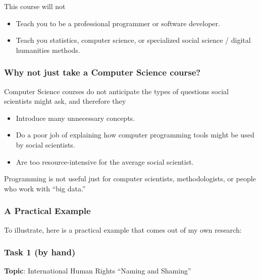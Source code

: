 \documentclass[
]{book}
\providecommand{\tightlist}{%
  \setlength{\itemsep}{0pt}\setlength{\parskip}{0pt}}
\begin{document}
This course will not

\begin{itemize}
\tightlist
\item
  Teach you to be a professional programmer or software developer.
\item
  Teach you statistics, computer science, or specialized social science / digital humanities methods.
\end{itemize}

\hypertarget{why-not-just-take-a-computer-science-course}{%
\subsubsection*{Why not just take a Computer Science course?}\label{why-not-just-take-a-computer-science-course}}

Computer Science courses do not anticipate the types of questions social scientists might ask, and therefore they

\begin{itemize}
\tightlist
\item
  Introduce many unnecessary concepts.
\item
  Do a poor job of explaining how computer programming tools might be used by social scientists.
\item
  Are too resource-intensive for the average social scientist.
\end{itemize}

Programming is not useful just for computer scientists, methodologists, or people who work with ``big data.''

\hypertarget{a-practical-example}{%
\subsubsection*{A Practical Example}\label{a-practical-example}}

To illustrate, here is a practical example that comes out of my own research:

\hypertarget{task-1-by-hand}{%
\subsubsection*{Task 1 (by hand)}\label{task-1-by-hand}}

\textbf{Topic}: International Human Rights ``Naming and Shaming''
\end{document}
